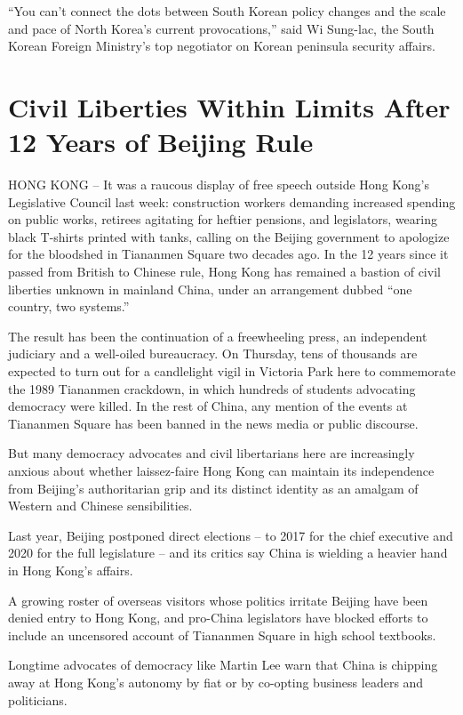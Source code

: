 \documentclass[12pt,a4paper,onecolumn]{article}
\begin{document}
``You can't connect the dots between South Korean policy changes and the scale and pace of North
Korea's current provocations,'' said Wi Sung-lac, the South Korean Foreign Ministry's top negotiator
on Korean peninsula security affairs.

\section{Civil Liberties Within Limits After 12 Years of Beijing Rule}

HONG KONG -- It was a raucous display of free speech outside Hong Kong's Legislative Council last
week: construction workers demanding increased spending on public works, retirees agitating for
heftier pensions, and legislators, wearing black T-shirts printed with tanks, calling on the Beijing
government to apologize for the bloodshed in Tiananmen Square two decades ago. In the 12 years since
it passed from British to Chinese rule, Hong Kong has remained a bastion of civil liberties unknown
in mainland China, under an arrangement dubbed ``one country, two systems.''

The result has been the continuation of a freewheeling press, an independent judiciary and a
well-oiled bureaucracy. On Thursday, tens of thousands are expected to turn out for a candlelight
vigil in Victoria Park here to commemorate the 1989 Tiananmen crackdown, in which hundreds of
students advocating democracy were killed. In the rest of China, any mention of the events at
Tiananmen Square has been banned in the news media or public discourse.

But many democracy advocates and civil libertarians here are increasingly anxious about whether
laissez-faire Hong Kong can maintain its independence from Beijing's authoritarian grip and its
distinct identity as an amalgam of Western and Chinese sensibilities.

Last year, Beijing postponed direct elections -- to 2017 for the chief executive and 2020 for the
full legislature -- and its critics say China is wielding a heavier hand in Hong Kong's affairs.

A growing roster of overseas visitors whose politics irritate Beijing have been denied entry to Hong
Kong, and pro-China legislators have blocked efforts to include an uncensored account of Tiananmen
Square in high school textbooks.

Longtime advocates of democracy like Martin Lee warn that China is chipping away at Hong Kong's
autonomy by fiat or by co-opting business leaders and politicians.
\end{document}
